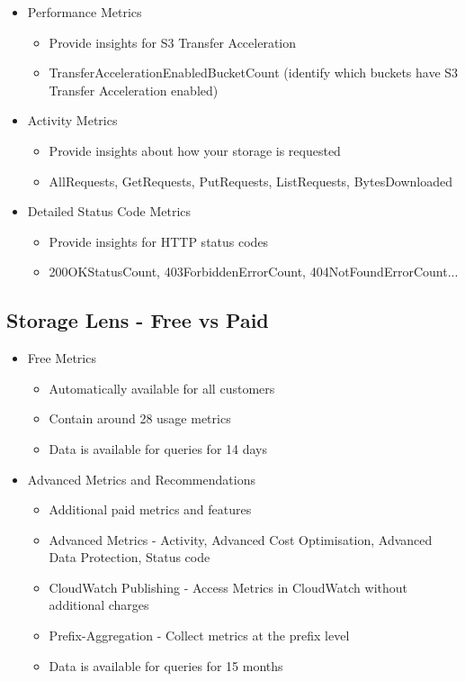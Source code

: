 \begin{itemize}
\begin{itemize}
        \item Provide insights for S3 Event Notifications
        \item EventNotificationEnabledBucketCount (identify which buckets have S3 Event Notifications)
    \end{itemize}
    \item Performance Metrics
    \begin{itemize}
        \item Provide insights for S3 Transfer Acceleration
        \item TransferAccelerationEnabledBucketCount (identify which buckets have S3 Transfer Acceleration enabled)
    \end{itemize}
    \item Activity Metrics
    \begin{itemize}
        \item Provide insights about how your storage is requested
        \item AllRequests, GetRequests, PutRequests, ListRequests, BytesDownloaded
    \end{itemize}
    \item Detailed Status Code Metrics
    \begin{itemize}
        \item Provide insights for HTTP status codes
        \item 200OKStatusCount, 403ForbiddenErrorCount, 404NotFoundErrorCount...
    \end{itemize}
\end{itemize}

\subsection{Storage Lens - Free vs Paid}
\begin{itemize}
    \item Free Metrics
    \begin{itemize}
        \item Automatically available for all customers
        \item Contain around 28 usage metrics
        \item Data is available for queries for 14 days
    \end{itemize}
    \item Advanced Metrics and Recommendations
    \begin{itemize}
        \item Additional paid metrics and features
        \item Advanced Metrics - Activity, Advanced Cost Optimisation, Advanced Data Protection, Status code
        \item CloudWatch Publishing - Access Metrics in CloudWatch without additional charges
        \item Prefix-Aggregation - Collect metrics at the prefix level
        \item Data is available for queries for 15 months
    \end{itemize}
\end{itemize}


